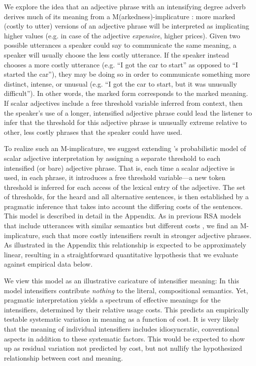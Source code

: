 \documentclass[10pt,letterpaper]{article}
\newcommand{\w}[1]{\emph{#1}}
\begin{document}
We explore the idea that an adjective phrase with an intensifying degree adverb derives much of its meaning from a M(arkedness)-implicature \cite{levinson}: more marked (costly to utter) versions of an adjective phrase will be interpreted as implicating higher values (e.g. in case of the adjective \w{expensive}, higher prices). 
Given two possible utterances a speaker could say to communicate the same meaning, a speaker will usually choose the less costly utterance. If the speaker instead chooses a more costly utterance (e.g. ``I got the car to start'' as opposed to ``I started the car''), they may be doing so in order to communicate something more distinct, intense, or unusual (e.g. ``I got the car to start, but it was unusually difficult''). In other words, the marked form corresponds to the marked meaning. If scalar adjectives include a free threshold variable inferred from context, then the speaker's use of a longer, intensified adjective phrase could lead the listener to infer that the threshold for this adjective phrase is unusually extreme relative to other, less costly phrases that the speaker could have used. 

To realize such an M-implicature, we suggest extending 's probabilistic model of scalar adjective interpretation by assigning a separate threshold to each intensified (or bare) adjective phrase. That is, each time a scalar adjective is used, in each phrase, it introduces a free threshold variable---a new token threshold is inferred for each access of the lexical entry of the adjective.
The set of thresholds, for the heard and all alternative sentences, is then established by a pragmatic inference that takes into account the differing costs of the sentences.
This model is described in detail in the Appendix.
As in previous RSA models that include utterances with similar semantics but different costs \cite{bergen}, we find an M-implicature, such that more costly intensifiers result in stronger adjective phrases.
As illustrated in the Appendix this relationship is expected to be approximately linear, resulting in a straightforward quantitative hypothesis that we evaluate against empirical data below.

We view this model as an illustrative caricature of intensifier meaning: In this model intensifiers contribute \emph{nothing} to the literal, compositional semantics. Yet, pragmatic interpretation yields a spectrum of effective meanings for the intensifiers, determined by their relative usage costs. This predicts an empirically testable systematic variation in meaning as a function of cost.
It is very likely that the meaning of individual intensifiers includes idiosyncratic, conventional aspects in addition to these systematic factors. This would be expected to show up as residual variation not predicted by cost, but not nullify the hypothesized relationship between cost and meaning.
\end{document}
